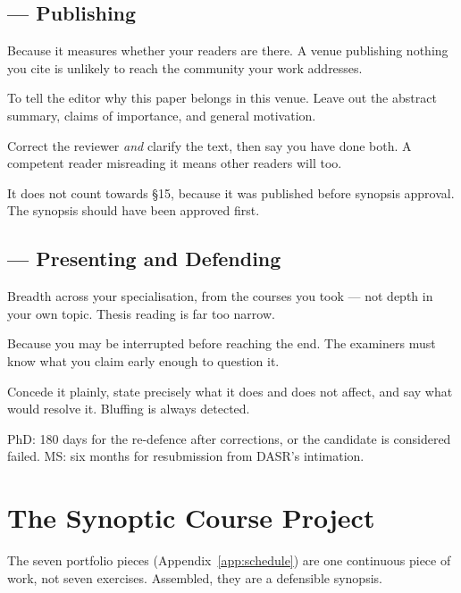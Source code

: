 \subsection*{ --- Publishing}
\begin{tightnum}
  \item Because it measures whether your readers are there. A venue publishing
    nothing you cite is unlikely to reach the community your work addresses.
  \item To tell the editor why this paper belongs in this venue. Leave out the
    abstract summary, claims of importance, and general motivation.
  \item Correct the reviewer \emph{and} clarify the text, then say you have done
    both. A competent reader misreading it means other readers will too.
  \item It does not count towards \S15, because it was published before synopsis
    approval. The synopsis should have been approved first.
\end{tightnum}

\subsection*{ --- Presenting and Defending}
\begin{tightnum}
  \item Breadth across your specialisation, from the courses you took --- not
    depth in your own topic. Thesis reading is far too narrow.
  \item Because you may be interrupted before reaching the end. The examiners
    must know what you claim early enough to question it.
  \item Concede it plainly, state precisely what it does and does not affect,
    and say what would resolve it. Bluffing is always detected.
  \item PhD: 180 days for the re-defence after corrections, or the candidate is
    considered failed. MS: six months for resubmission from DASR's intimation.
\end{tightnum}

\section{The Synoptic Course Project}

The seven portfolio pieces (Appendix~\ref{app:schedule}) are one continuous
piece of work, not seven exercises. Assembled, they are a defensible synopsis.

